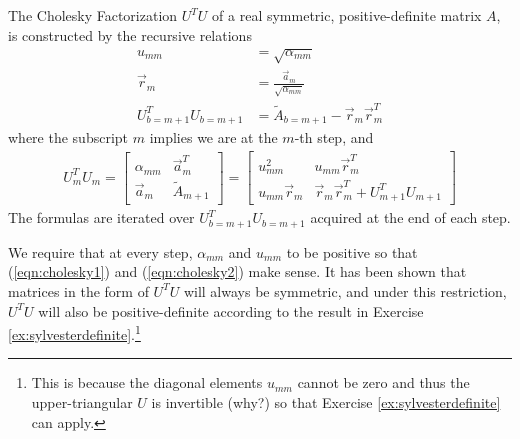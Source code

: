 \begin{defn}
The Cholesky Factorization $U^TU$ of a real symmetric, positive-definite matrix $A$, is constructed by the recursive relations
\begin{subequations}
\begin{align}
u_{mm} &= \sqrt{\alpha_{mm}} \label{eqn:cholesky1} \\
\vec{r}_m &= \frac{\vec{a}_m}{\sqrt{\alpha_{mm}}} \label{eqn:cholesky2} \\
U_{b=m+1}^T U_{b=m+1} &= \tilde{A}_{b=m+1} - \vec{r}_m\vec{r}_m^T 
\end{align}    
\end{subequations}
where the subscript $m$ implies we are at the $m$-th step, and
\begin{align}
U_m^T U_m = 
\begin{bmatrix}
\alpha_{mm} & \vec{a}_{m}^T \\
\vec{a}_m & \tilde{A}_{m+1} 
\end{bmatrix}
=
\begin{bmatrix}
u_{mm}^2 & u_{mm}\vec{r}_m^T \\
u_{mm}\vec{r}_m & \vec{r}_m\vec{r}_m^T + U_{m+1}^T U_{m+1}
\end{bmatrix} 
\end{align}
The formulas are iterated over $U_{b=m+1}^T U_{b=m+1}$ acquired at the end of each step.
\end{defn}
We require that at every step, $\alpha_{mm}$ and $u_{mm}$ to be positive so that (\ref{eqn:cholesky1}) and (\ref{eqn:cholesky2}) make sense. It has been shown that matrices in the form of $U^T U$ will always be symmetric, and under this restriction, $U^T U$ will also be positive-definite according to the result in Exercise \ref{ex:sylvesterdefinite}.\footnote{This is because the diagonal elements $u_{mm}$ cannot be zero and thus the upper-triangular $U$ is invertible (why?) so that Exercise \ref{ex:sylvesterdefinite} can apply.} 

